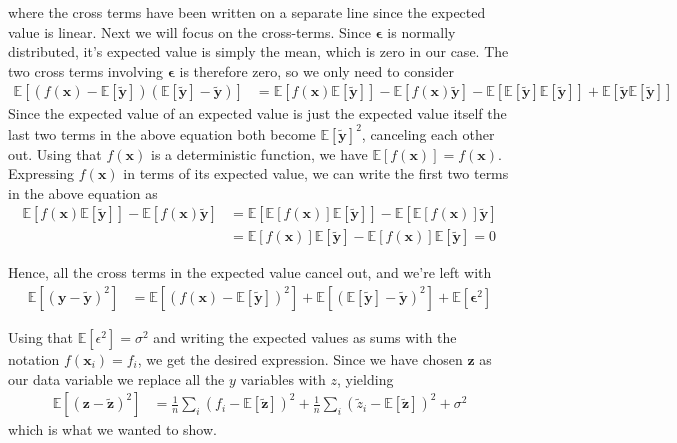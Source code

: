\documentclass[reprint,english,notitlepage,aps,nobalancelastpage,nofootinbib]{revtex4-1}  %
\newcommand{\expy}{\mathbb{E}[\mathbf{\tilde{y}}]}
\newcommand{\expz}{\mathbb{E}[\mathbf{\tilde{z}}]}
\newcommand{\closed}[1]{\left({#1}\right)}
\newcommand{\bracket}[1]{\left[{#1}\right]}
\begin{document}
where the cross terms have been written on a separate line since the expected value is linear. Next we will focus on the cross-terms. Since $\bm{\epsilon}$ is normally distributed, it's expected value is simply the mean, which is zero in our case. The two cross terms involving $\bm{\epsilon}$ is therefore zero, so we only need to consider
\begin{align*}
  \mathbb{E}\bracket{(f(\mathbf{x}) - \expy)(\expy - \mathbf{\tilde{y}})} &= \mathbb{E}\bracket{f(\mathbf{x})\expy} - \mathbb{E}\bracket{f(\mathbf{x})\mathbf{\tilde{y}}} - \mathbb{E}\bracket{\expy\expy} + \mathbb{E}\bracket{\mathbf{\tilde{y}}\expy}
\end{align*}
Since the expected value of an expected value is just the expected value itself the last two terms in the above equation both become $\expy^2$, canceling each other out. Using that $f(\mathbf{x})$ is a deterministic function, we have $\mathbb{E}[f(\mathbf{x})]=f(\mathbf{x})$. Expressing $f(\mathbf{x})$ in terms of its expected value, we can write the first two terms in the above equation as
\begin{align*}
  \mathbb{E}\bracket{f(\mathbf{x})\expy} - \mathbb{E}\bracket{f(\mathbf{x})\mathbf{\tilde{y}}} &= \mathbb{E}\bracket{\mathbb{E}\bracket{f(\mathbf{x})}\expy} - \mathbb{E}\bracket{\mathbb{E}\bracket{f(\mathbf{x})}\mathbf{\tilde{y}}} \\
  &= \mathbb{E}\bracket{f(\mathbf{x})}\expy - \mathbb{E}\bracket{f(\mathbf{x})}\expy = 0
\end{align*}

Hence, all the cross terms in the expected value cancel out, and we're left with
\begin{align*}
  \mathbb{E}\left[(\mathbf{y} - \mathbf{\tilde{y}})^2\right] &= \mathbb{E}\bracket{\closed{f(\mathbf{x})-\expy}^2} + \mathbb{E}\bracket{\closed{\expy - \mathbf{\tilde{y}}}^2} + \mathbb{E}\bracket{\bm{\epsilon}^2}
\end{align*}

Using that $\mathbb{E}[\epsilon^2]=\sigma^2$ and writing the expected values as sums with the notation $f(\mathbf{x}_i)=f_i$, we get the desired expression. Since we have chosen $\mathbf{z}$ as our data variable we replace all the $y$ variables with $z$, yielding
\begin{align}
  \mathbb{E}\left[(\mathbf{z} - \mathbf{\tilde{z}})^2\right] &= \frac{1}{n} \sum_i (f_i - \expz)^2 + \frac{1}{n}\sum_i (\tilde{z}_i - \expz )^2 + \sigma^2
\end{align}
which is what we wanted to show.
\end{document}
